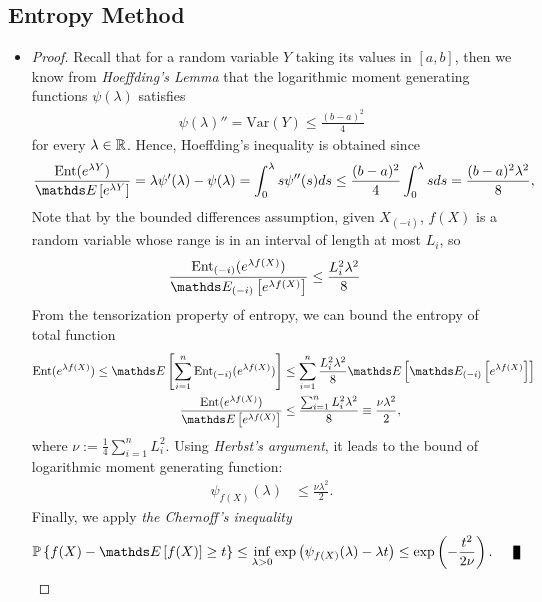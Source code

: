 \documentclass[11pt]{article}
\begin{document}
\subsection{Entropy Method}
\begin{itemize}
\item \begin{proof}
Recall that for a random variable $Y$ taking its values in $[a, b]$, then we know from \emph{Hoeffding's Lemma} that the logarithmic moment generating functions $\psi(\lambda)$ satisfies
\begin{align*}
\psi(\lambda)'' = \text{Var}(Y) \le \frac{(b-a)^2}{4}
\end{align*} for every $\lambda \in {\mathbb R}$. Hence, Hoeffding's inequality is obtained since
\begin{align*}
\frac{\text{Ent}(e^{\lambda Y})}{\E{}{e^{\lambda Y}}} = \lambda \psi'(\lambda) - \psi(\lambda) = \int_{0}^{\lambda} s \psi''(s) ds \le \frac{(b-a)^2}{4}  \int_{0}^{\lambda} s ds =  \frac{(b-a)^2 \lambda^2}{8},
\end{align*} Note that by the bounded differences assumption, given $X_{(-i)}$, $f(X)$ is a random variable whose range is in an interval of length at most $L_i$, so 
\begin{align*}
\frac{\text{Ent}_{(-i)}(e^{\lambda f(X)})}{\E{(-i)}{e^{\lambda f(X)}}} &\le  \frac{L_i^2 \lambda^2}{8} 
\end{align*} 
From the  tensorization property of entropy, we can bound the entropy of total function
\begin{align*}
\text{Ent}(e^{\lambda f(X)}) \le \E{}{\sum_{i=1}^{n}\text{Ent}_{(-i)}(e^{\lambda f(X)})} &\le \sum_{i=1}^{n} \frac{L_i^2 \lambda^2}{8} \E{}{\E{(-i)}{e^{\lambda f(X)}}}\\
\frac{\text{Ent}(e^{\lambda f(X)}) }{ \E{}{e^{\lambda f(X)}} } &\le \frac{\sum_{i=1}^{n}L_i^2 \lambda^2}{8} \equiv \frac{\nu \lambda^2}{2},
\end{align*} where  $\nu := \frac{1}{4}\sum_{i=1}^{n}L_i^2$.  Using \emph{Herbst's argument}, it leads to the bound of logarithmic moment generating function:
\begin{align*}
\psi_{f(X)}(\lambda) &\le \frac{\nu \lambda^2}{2}.
\end{align*} Finally, we apply \emph{the Chernoff's inequality}
\begin{align*}
\bP\set{f(X) - \E{}{f(X)} \ge t } &\le  \inf_{\lambda >0 }\exp\paren{\psi_{f(X)}(\lambda) - \lambda t} \le \exp\paren{- \frac{t^2}{2 \nu}}.  \qed
\end{align*}
\end{proof}
\end{itemize}
\end{document}
